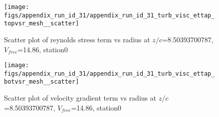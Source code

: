 \begin{figure}[H]
\centering
\texttt{[image: figs/appendix\_run\_id\_31/appendix\_run\_id\_31\_turb\_visc\_ettap\_topvsr\_mesh\_\_scatter]}
\caption{Scatter plot of reynolds stress term vs radius at $z/c$=8.50393700787, $V_{free}$=14.86, station0}
\label{fig:appendix_run_id_31_turb_visc_ettap_topvsr_mesh__scatter}
\end{figure}


\begin{figure}[H]
\centering
\texttt{[image: figs/appendix\_run\_id\_31/appendix\_run\_id\_31\_turb\_visc\_ettap\_botvsr\_mesh\_\_scatter]}
\caption{Scatter plot of velocity gradient term vs radius at $z/c$=8.50393700787, $V_{free}$=14.86, station0}
\label{fig:appendix_run_id_31_turb_visc_ettap_botvsr_mesh__scatter}
\end{figure}


